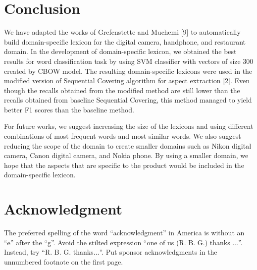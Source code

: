 \documentclass[a4paper,conference]{IEEEtran}
\begin{document}
\section{Conclusion}
We have adapted the works of Grefenstette and Muchemi [9] to automatically build domain-specific lexicon for the digital camera, handphone, and restaurant domain. In the development of domain-specific lexicon, we obtained the best results for word classification task by using SVM classifier with vectors of size 300 created by CBOW model. The resulting domain-specific lexicons were used in the modified version of Sequential Covering algorithm for aspect extraction [2]. Even though the recalls obtained from the modified method are still lower than the recalls obtained from baseline Sequential Covering, this method managed to yield better F1 scores than the baseline method.

For future works, we suggest increasing the size of the lexicons and using different combinations of most frequent words and most similar words. We also suggest reducing the scope of the domain to create smaller domains such as Nikon digital camera, Canon digital camera, and Nokia phone. By using a smaller domain, we hope that the aspects that are specific to the product would be included in the domain-specific lexicon.


\section*{Acknowledgment}

The preferred spelling of the word ``acknowledgment'' in America is without 
an ``e'' after the ``g''. Avoid the stilted expression ``one of us (R. B. 
G.) thanks $\ldots$''. Instead, try ``R. B. G. thanks$\ldots$''. Put sponsor 
acknowledgments in the unnumbered footnote on the first page.
\end{document}
